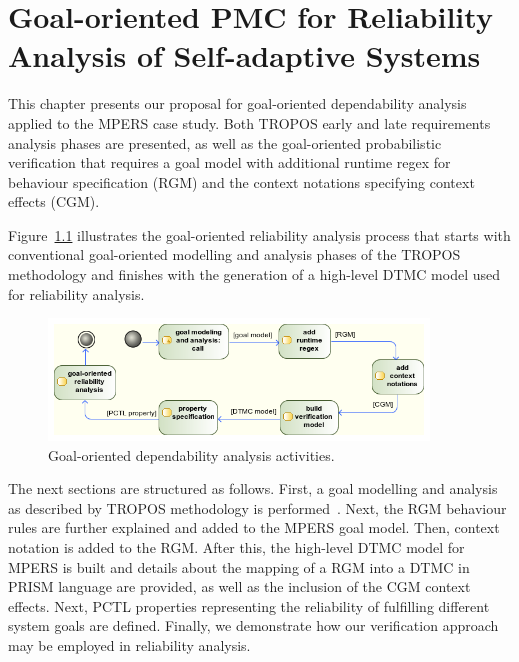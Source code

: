 \chapter{Goal-oriented PMC for Reliability Analysis of Self-adaptive Systems}\label{ch:proposal}

This chapter presents our proposal for goal-oriented dependability analysis applied to the MPERS case study. Both TROPOS early and late requirements analysis phases are presented, as well as the goal-oriented probabilistic verification that requires a goal model with additional runtime regex for behaviour specification (RGM) and the context notations specifying context effects (CGM).




Figure~\ref{fig:CRGM_TO_DTMC} illustrates the goal-oriented reliability analysis process that starts with conventional goal-oriented modelling and analysis phases of the TROPOS methodology and finishes with the generation of a high-level DTMC model used for reliability analysis. 


\begin{figure}[h!]
\centering
\includegraphics[width=0.9\textwidth]{imgs/CRGM_TO_DTMC.png}
\caption{Goal-oriented dependability analysis activities.}
\label{fig:CRGM_TO_DTMC}
\end{figure}

The next sections are structured as follows. First, a goal modelling and analysis as described by TROPOS methodology is performed~\cite{Bresciani:2004}. Next, the RGM behaviour rules are further explained and added to the MPERS goal model. Then, context notation is added to the RGM. After this, the high-level DTMC model for MPERS is built and details about the mapping of a RGM into a DTMC in PRISM language are provided, as well as the inclusion of the CGM context effects. Next, PCTL properties representing the reliability of fulfilling different system goals are defined. Finally, we demonstrate how our verification approach may be employed in reliability analysis. 


